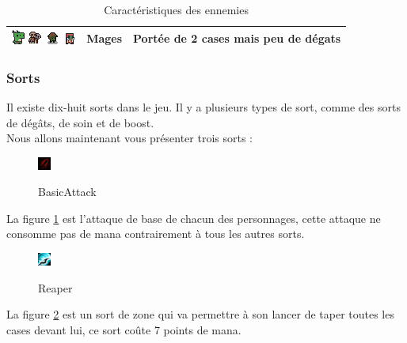 \documentclass[a4paper, 12pt, twoside]{article}
\begin{document}
\begin{table}[H]
\begin{center}
\begin{tabular}{ | c | c | c | }
        \hline
        \includegraphics[scale=2]{./Monsters/Lizard}
        \includegraphics[scale=1.5]{./Monsters/SkeletonMagus} 
        \includegraphics[scale=1.5]{./Monsters/Goblin}
        \includegraphics[scale=2]{./Monsters/Shaman} & Mages & Portée de 2 cases mais peu de dégats\\
    	\hline
    \end{tabular}
    \caption{Caractéristiques des ennemies}
    \label{monster}
    \end{center}
\end{table}

\subsubsection{Sorts}
Il existe dix-huit sorts dans le jeu. Il y a plusieurs types de sort, comme des sorts de dégâts, de soin et de boost. \\
Nous allons maintenant vous présenter trois sorts : 

\begin{figure}[h]
    \center
    \includegraphics[scale=2]{./Spell/Basic1}\\
    \caption{BasicAttack}
    \label{fig:BasicAttack}
\end{figure}
La figure \ref{fig:BasicAttack} est l'attaque de base de chacun des personnages, cette attaque ne consomme pas de mana contrairement à tous les autres sorts.

\begin{figure}[h]
    \begin{center}
    \includegraphics[scale=2]{./Spell/Reaper1}\\
    \caption{Reaper}
    \label{fig:Reaper}
    \end{center}
\end{figure}
La figure \ref{fig:Reaper} est un sort de zone qui va permettre à son lancer de taper toutes les cases devant lui, ce sort coûte 7 points de mana.\\
\end{document}

